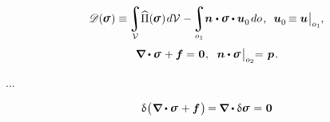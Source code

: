 \nopagebreak
\begin{equation}\label{thecomplementaryenergyfunctional}
\complementaryenergyfunctional (\hspace{-0.1ex}\linearstress\hspace{.1ex})
\equiv \hspace{-0.2ex}
\displaystyle \integral\displaylimits_{\mathcal{V}} \hspace{-0.5ex}
\widehat{\potential}(\hspace{-0.1ex}\linearstress\hspace{.1ex}) \hspace{.2ex} d\mathcal{V} \hspace{.1ex}
- \hspace{-0.2ex}
\displaystyle\integral\displaylimits_{o_1} \hspace{-0.5ex}
\unitnormalvector \hspace{.1ex} \dotp \linearstress \dotp \bm{u}_{\raisemath{-0.1em}{0}} \hspace{.25ex} do
\hspace{.2ex} ,
\hspace{.5em}
\bm{u}_{\raisemath{-0.1em}{0}} \hspace{-0.2ex} \equiv \bm{u} \hspace{.1ex} \bigr|_{o_1}
\hspace{-0.1ex} ,
\end{equation}
%
\nopagebreak\vspace{-0.4em}\begin{equation*}
\boldnabla \dotp \linearstress \hspace{.15ex} + \bm{f} = \hspace{.1ex} \bm{0} \hspace{.1ex} ,
\hspace{.6em}
\unitnormalvector \dotp \linearstress \hspace{.2ex} \bigr|_{o_2} \hspace{-0.66ex} = \hspace{.2ex} \bm{p}
\hspace{.2ex} .
\end{equation*}

...


\noindent
\begin{equation*}\label{the variation of the balance of force equation}
\variation{\hspace{.1ex} \bigl( \hspace{.1ex}
\boldnabla \dotp \linearstress
\hspace{.15ex} +
\bm{f}
\hspace{.15ex} \bigr)} \hspace{-0.2ex}
= \hspace{-0.1ex}
\boldnabla \dotp \variation{\linearstress} \hspace{.15ex}
= \hspace{.1ex} \bm{0}
\end{equation*}

